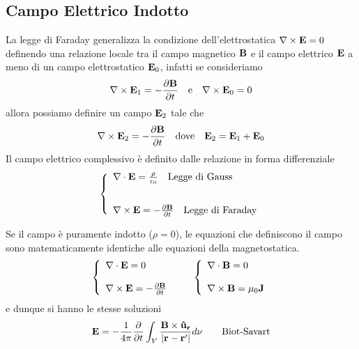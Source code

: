 \subsection{Campo Elettrico Indotto}

La legge di Faraday generalizza la  condizione dell'elettrostatica  $\nabla \times \bold{E} = 0$ definendo una relazione locale tra il campo magnetico $\bold{B}$ e il campo elettrico $\bold{E}$ a meno di un campo elettrostatico $\bold{E}_0$, infatti se consideriamo 
\begin{align*}
	\nabla \times \bold{E}_1 = - \frac{\partial \bold{B}}{\partial t} \quad \text{e} \quad \nabla \times \bold{E}_0 = 0
\end{align*}
allora possiamo definire un campo $\bold{E}_2$ tale che 
\begin{equation*}
	\nabla \times \bold{E}_2 = - \frac{\partial \bold{B}}{\partial t} \quad \text{dove} \quad \bold{E}_2 = \bold{E}_1 + \bold{E}_0
\end{equation*}
Il campo elettrico complessivo \`e definito dalle relazione in forma differenziale 
\begin{align*}
	\left \{ \begin{array}{l}
		\nabla \cdot \bold{E} = \frac{\rho}{\varepsilon_0} \quad \text{Legge di Gauss} \\ \rule{0pt}{30pt}
		\nabla \times \bold{E} = - \frac{\partial \bold{B}}{\partial t} \quad \text{Legge di Faraday}
	\end{array}\right.
\end{align*}

Se il campo \`e puramente indotto ($\rho = 0$), le equazioni che definiscono il campo sono matematicamente identiche alle equazioni della magnetostatica.
\begin{align*}
	\left \{ \begin{array}{l}
	\nabla \cdot \bold{E} = 0 \\ \rule{0pt}{20pt} 
	\nabla \times \bold{E} = - \frac{\partial \bold{B}}{\partial t}		
	\end{array}\right.
	\quad \quad  
	\left \{ \begin{array}{l}
	\nabla \cdot \bold{B} = 0 \\ \rule{0pt}{20pt} 
	\nabla \times \bold{B} = \mu_0 \bold{J}		
	\end{array}\right.
\end{align*}
e dunque si hanno le stesse soluzioni 
\begin{equation*}
	\bold{E} = - \frac{1}{4 \pi } \frac{\partial}{\partial t} \int_{V} \frac{\bold{B} \times \bold{\hat{u}_r}}{|\bold{r} - \bold{r}'|}d \nu \quad \quad \text{Biot-Savart}
\end{equation*}

